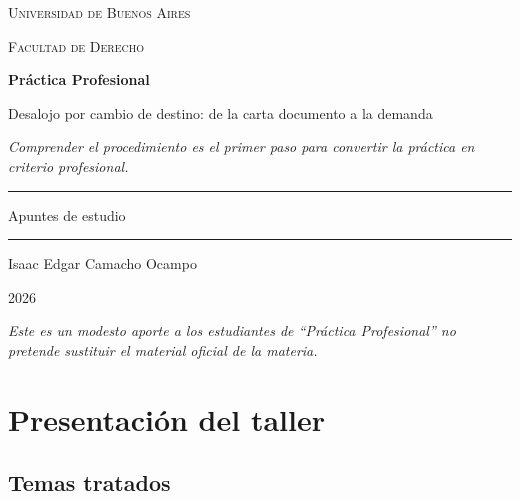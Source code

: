 \documentclass[12pt,oneside]{book}
\newcommand{\universidad}{Universidad de Buenos Aires}
\newcommand{\facultad}{Facultad de Derecho}
\newcommand{\materia}{Práctica Profesional}
\newcommand{\titulo}{Desalojo por cambio de destino: de la carta documento a la demanda}
\newcommand{\autor}{Isaac Edgar Camacho Ocampo}
\newcommand{\anio}{2026}
\begin{document}
\begin{titlepage}
\thispagestyle{empty}
\begin{center}

\vspace*{1cm}
{\large \textsc{\universidad}}

\vspace{0.2cm}
{\large \textsc{\facultad}}

\vspace{3cm}
{\Huge \textbf{\materia}}

\vspace{1cm}
{\LARGE \titulo}

\vspace{0.8cm}
\textit{Comprender el procedimiento es el primer paso para convertir la práctica en criterio profesional.}

\vspace{1.2cm}
\rule{0.70\textwidth}{0.5pt}

\vspace{0.5cm}
{\large Apuntes de estudio}

\vspace{0.5cm}
\rule{0.70\textwidth}{0.5pt}

\vfill
{\large \autor}

\vspace{0.3cm}
{\large \anio}

\end{center}

\vfill
\begin{flushleft}
\textit{Este es un modesto aporte a los estudiantes de ``Práctica Profesional'' no pretende sustituir el material oficial de la materia.}
\end{flushleft}
\end{titlepage}

\tableofcontents
\clearpage

\chapter*{Presentación del taller}

\section*{Temas tratados}
\end{document}
